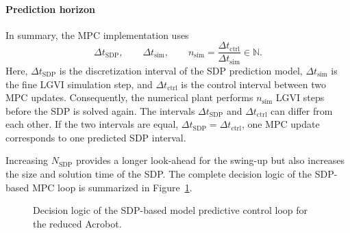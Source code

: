 \paragraph{Prediction horizon}
In summary, the MPC implementation uses
\begin{equation}
    \Delta t_{\mathrm{SDP}},
    \qquad
    \Delta t_{\mathrm{sim}},
    \qquad
    n_{\mathrm{sim}}
    =\frac{\Delta t_{\mathrm{ctrl}}}{\Delta t_{\mathrm{sim}}} \in \mathbb{N}.
    \label{eq:acrobot_mpc_time_scales}
\end{equation}
Here, \(\Delta t_{\mathrm{SDP}}\) is the discretization interval of the SDP prediction
model, \(\Delta t_{\mathrm{sim}}\) is the fine LGVI simulation step, and
\(\Delta t_{\mathrm{ctrl}}\) is the control interval between two MPC updates.
Consequently, the numerical plant performs \(n_{\mathrm{sim}}\) LGVI steps
before the SDP is solved again. The intervals \(\Delta t_{\mathrm{SDP}}\) and
\(\Delta t_{\mathrm{ctrl}}\) can differ from each other. If the two intervals are equal,
$\Delta t_{\mathrm{SDP}} = \Delta t_{\mathrm{ctrl}}$, one MPC
update corresponds to one predicted SDP interval.

Increasing \(N_{\mathrm{SDP}}\) 
provides a longer look-ahead for the swing-up but also increases the size
and solution time of the SDP. The complete decision logic of the SDP-based MPC loop is summarized in Figure~\ref{fig:acrobot_sdp_mpc_logic}.

\begin{figure}[!ht]
    \centering
    \resizebox{0.95\textwidth}{!}{%
    }
    \caption{Decision logic of the SDP-based model predictive control loop for the reduced Acrobot.}
    \label{fig:acrobot_sdp_mpc_logic}
\end{figure}

